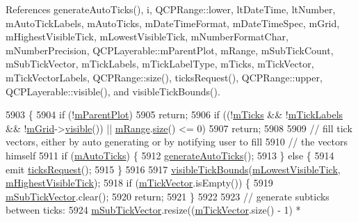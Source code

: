 References generate\+Auto\+Ticks(), i, Q\+C\+P\+Range\+::lower, lt\+Date\+Time, lt\+Number, m\+Auto\+Tick\+Labels, m\+Auto\+Ticks, m\+Date\+Time\+Format, m\+Date\+Time\+Spec, m\+Grid, m\+Highest\+Visible\+Tick, m\+Lowest\+Visible\+Tick, m\+Number\+Format\+Char, m\+Number\+Precision, Q\+C\+P\+Layerable\+::m\+Parent\+Plot, m\+Range, m\+Sub\+Tick\+Count, m\+Sub\+Tick\+Vector, m\+Tick\+Labels, m\+Tick\+Label\+Type, m\+Ticks, m\+Tick\+Vector, m\+Tick\+Vector\+Labels, Q\+C\+P\+Range\+::size(), ticks\+Request(), Q\+C\+P\+Range\+::upper, Q\+C\+P\+Layerable\+::visible(), and visible\+Tick\+Bounds().


\begin{DoxyCode}
5903                                \{
5904   \textcolor{keywordflow}{if} (!\hyperlink{class_q_c_p_layerable_aa2a528433e44db02b8aef23c1f9f90ed}{mParentPlot})
5905     \textcolor{keywordflow}{return};
5906   \textcolor{keywordflow}{if} ((!\hyperlink{class_q_c_p_axis_ab111e74bba22e06848897c932fc549fe}{mTicks} && !\hyperlink{class_q_c_p_axis_a3e4315be072026644e69009557a2fa11}{mTickLabels} && !\hyperlink{class_q_c_p_axis_a17bffb94aaa40311f259c6ac7bcb5d5f}{mGrid}->\hyperlink{class_q_c_p_layerable_a10a3cc92e0fa63e4a929e61d34e275a7}{visible}()) || 
      \hyperlink{class_q_c_p_axis_a1ee36773c49062d751560e11f90845f7}{mRange}.\hyperlink{class_q_c_p_range_afa57c13049b965edb6fd1c00ac56338a}{size}() <= 0)
5907     \textcolor{keywordflow}{return};
5908 
5909   \textcolor{comment}{// fill tick vectors, either by auto generating or by notifying user to fill}
5910   \textcolor{comment}{// the vectors himself}
5911   \textcolor{keywordflow}{if} (\hyperlink{class_q_c_p_axis_aac23adcbae246bf165d4539ad65ac9f9}{mAutoTicks}) \{
5912     \hyperlink{class_q_c_p_axis_a626eef437c874148df1a5ac78506d463}{generateAutoTicks}();
5913   \} \textcolor{keywordflow}{else} \{
5914     emit \hyperlink{class_q_c_p_axis_af46d99613d29518795134ec4928e3873}{ticksRequest}();
5915   \}
5916 
5917   \hyperlink{class_q_c_p_axis_a06320a944d1120732cc0d72fe1306d8b}{visibleTickBounds}(\hyperlink{class_q_c_p_axis_aebb24ba8734b7e054efc6e1ecc5414c7}{mLowestVisibleTick}, 
      \hyperlink{class_q_c_p_axis_abb3b3ccce7e9779fef2be91ce1a46ef0}{mHighestVisibleTick});
5918   \textcolor{keywordflow}{if} (\hyperlink{class_q_c_p_axis_aae0f9b9973b85be601200f00f5825087}{mTickVector}.isEmpty()) \{
5919     \hyperlink{class_q_c_p_axis_a28353081e0ff35c3fe5ced923a287faa}{mSubTickVector}.clear();
5920     \textcolor{keywordflow}{return};
5921   \}
5922 
5923   \textcolor{comment}{// generate subticks between ticks:}
5924   \hyperlink{class_q_c_p_axis_a28353081e0ff35c3fe5ced923a287faa}{mSubTickVector}.resize((\hyperlink{class_q_c_p_axis_aae0f9b9973b85be601200f00f5825087}{mTickVector}.size() - 1) * 

\end{DoxyCode}
